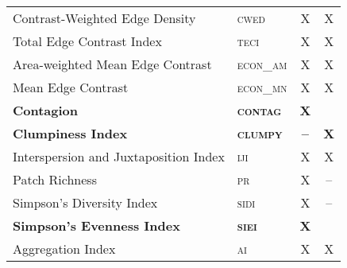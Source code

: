 \begin{itemize}
\begin{table}[]
\begin{tabular}{@{}llcc@{}}
Contrast-Weighted Edge Density        & \textsc{cwed           } & X               & X           \\
Total Edge Contrast Index             & \textsc{teci           } & X               & X           \\
Area-weighted Mean Edge Contrast      & \textsc{econ\_am       } & X               & X           \\
Mean Edge Contrast                    & \textsc{econ\_mn       } & X               & X           \\
{\bf Contagion}                       & {\bf \textsc{ contag}   } & {\bf X}         & {\bf }      \\
{\bf Clumpiness Index}                & {\bf \textsc{ clumpy}   } & {\bf --}        & {\bf X}     \\
Interspersion and Juxtaposition Index & \textsc{iji            } & X               & X           \\
Patch Richness                        & \textsc{pr             } & X               & --            \\
Simpson’s Diversity Index             & \textsc{sidi           } & X               & --            \\
{\bf Simpson’s Evenness Index}        & \textsc{{\bf siei}     } & {\bf X}         & {\bf }      \\
Aggregation Index                     & \textsc{ai             } & X               & X           \\ \bottomrule
\end{tabular}
\end{table}


\end{itemize}
